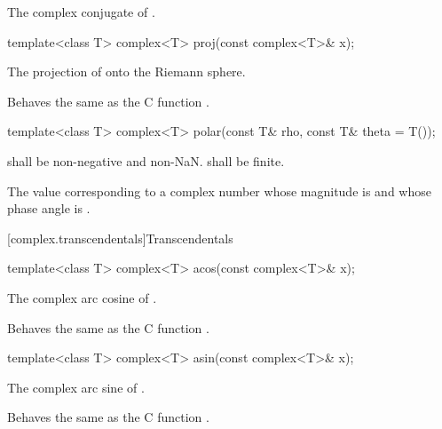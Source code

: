 \begin{itemdescr}
\pnum
\returns
The complex conjugate of .
\end{itemdescr}

%
\begin{itemdecl}
template<class T> complex<T> proj(const complex<T>& x);
\end{itemdecl}

\begin{itemdescr}
\pnum
\returns The projection of  onto the Riemann sphere.

\pnum
\remarks
Behaves the same as the C function .
\end{itemdescr}

%
\begin{itemdecl}
template<class T> complex<T> polar(const T& rho, const T& theta = T());
\end{itemdecl}

\begin{itemdescr}
\pnum
\requires
{} shall be non-negative and non-NaN\@.  shall be finite.

\pnum
\returns
The
value corresponding
to a complex number whose magnitude is  and whose phase angle
is .
\end{itemdescr}

[complex.transcendentals]{Transcendentals}

%
%
\begin{itemdecl}
template<class T> complex<T> acos(const complex<T>& x);
\end{itemdecl}

\begin{itemdescr}
\pnum
\returns The complex arc cosine of .

\pnum
\remarks
Behaves the same as the C function .
\end{itemdescr}

%
%
\begin{itemdecl}
template<class T> complex<T> asin(const complex<T>& x);
\end{itemdecl}

\begin{itemdescr}
\pnum
\returns The complex arc sine of .

\pnum
\remarks
Behaves the same as the C function .
\end{itemdescr}

